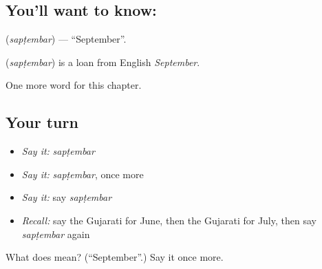 \subsection*{You'll want to know: }
\textbf{} (\emph{sapṭembar}) — \textquotedblleft{}September\textquotedblright{}.

\begin{cousinweb}
\textbf{} (\emph{sapṭembar}) is a loan from English \emph{September}.
\end{cousinweb}

\begin{grammarlens}[title={What you've built}]
One more word for this chapter.
\end{grammarlens}

\subsection*{Your turn}
\begin{itemize}
\raggedright
  \item \emph{Say it:} \emph{sapṭembar}
  \item \emph{Say it:} \emph{sapṭembar}, once more
  \item \emph{Say it:} say \emph{sapṭembar}
  \item \emph{Recall:} say the Gujarati for June, then the Gujarati for July, then say \emph{sapṭembar} again
\end{itemize}

\begin{tcolorbox}[breakable,colback=teal!4,colframe=teal!35!black,title={Before you move on}]
What does  mean? (\textquotedblleft{}September\textquotedblright{}.) Say it once more.
\end{tcolorbox}

